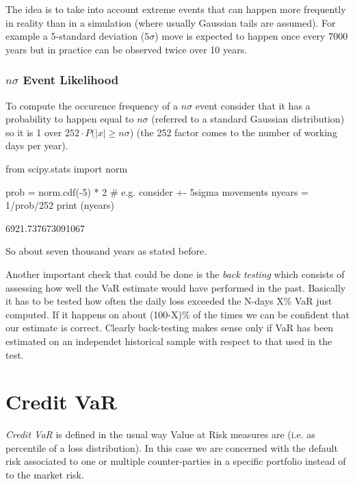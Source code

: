 The idea is to take into account extreme events that can happen more frequently in reality than in a simulation (where usually Gaussian tails are assumed). For example a 5-standard deviation ($5\sigma$) move is expected to happen once every 7000 years but in practice can be observed twice over 10 years.

\begin{attention}
\subsubsection{$n\sigma$ Event Likelihood}
To compute the occurence frequency of a $n\sigma$ event consider that it has a probability to happen equal to $n\sigma$ (referred to a standard Gaussian distribution) so it is 1 over $252\cdot P(|x| \ge n\sigma$) (the 252 factor comes to the number of working days per year).

\begin{attpython}
from scipy.stats import norm

prob = norm.cdf(-5) * 2 # e.g. consider +- 5sigma movements
nyears = 1/prob/252
print (nyears)
\end{attpython}
\begin{ioutput}
6921.737673091067
\end{ioutput}
\noindent
So about seven thousand years as stated before.
\end{attention}

Another important check that could be done is the \emph{back testing} which consists of assessing how well the VaR estimate would have performed in the past. Basically it has to be tested how often the daily loss exceeded the N-days X\% VaR just computed. If it happens on about (100-X)\% of the times we can be confident that our estimate is correct. Clearly back-testing makes sense only if VaR has been estimated on an independet historical sample with respect to that used in the test.

\section{Credit VaR}
\label{credit-var-cr-var}


\emph{Credit VaR} is defined in the usual way Value at Risk measures are (i.e. as percentile of a loss distribution).
In this case we are concerned with the default risk associated to one or multiple counter-parties in a specific portfolio instead of to the market risk.

